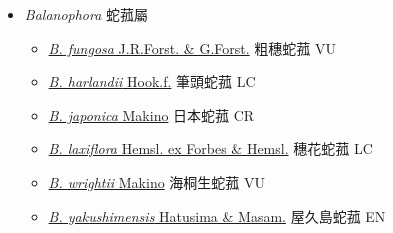 
  \begin{itemize}
 \item[] \textit{Balanophora} 蛇菰屬
                                
  \begin{itemize}
        \item[] \href{http://www.theplantlist.org/tpl1.1/search?q=Balanophora+fungosa}{\textit{B. fungosa} J.R.Forst. \& G.Forst.}   粗穗蛇菰   VU
        \item[] \href{http://www.theplantlist.org/tpl1.1/search?q=Balanophora+harlandii}{\textit{B. harlandii} Hook.f.}   筆頭蛇菰   LC
        \item[] \href{http://www.theplantlist.org/tpl1.1/search?q=Balanophora+japonica}{\textit{B. japonica} Makino}   日本蛇菰   CR
        \item[] \href{http://www.theplantlist.org/tpl1.1/search?q=Balanophora+laxiflora}{\textit{B. laxiflora} Hemsl. ex Forbes \& Hemsl.}   穗花蛇菰   LC
        \item[] \href{http://www.theplantlist.org/tpl1.1/search?q=Balanophora+wrightii}{\textit{B. wrightii} Makino}   海桐生蛇菰   VU
        \item[] \href{http://www.theplantlist.org/tpl1.1/search?q=Balanophora+yakushimensis}{\textit{B. yakushimensis} Hatusima \& Masam.}   屋久島蛇菰   EN
  \end{itemize}
  \end{itemize}
